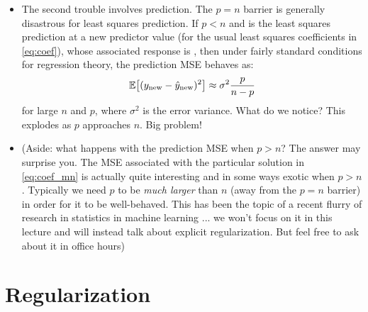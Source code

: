 \documentclass{article}
\begin{document}
\begin{itemize}
\item The second trouble involves prediction. The $p = n$ barrier is generally
  disastrous for least squares prediction. If $p < n$ and  is the least squares prediction at a new predictor
  value  (for \smash{$\hbeta$} the usual least squares
  coefficients in \eqref{eq:coef}), whose associated response is
  , then under fairly standard conditions for regression
  theory,
  the prediction MSE behaves as: 
  \[
  \mathbb{E} \big[ (y_{\text{new}} - \hat{y}_{\text{new}})^2 \big] \approx \sigma^2
  \frac{p}{n-p} 
  \]
  for large $n$ and $p$, where $\sigma^2$ is the error variance. What do we
  notice? This explodes as $p$ approaches $n$. Big problem!

\item (Aside: what happens with the prediction MSE when $p > n$? The answer may
  surprise you. The MSE associated with the particular solution in
  \eqref{eq:coef_mn} is actually quite interesting and in some ways exotic when 
  $p > n$. Typically we need $p$ to be \emph{much larger} than $n$ (away from
  the $p = n$ barrier) in order for it to be well-behaved. This has been the
  topic of a recent flurry of research in statistics in machine learning ...  we
  won't focus on it in this lecture and will instead talk about explicit
  regularization. But feel free to ask about it in office hours)    
\end{itemize}

\section{Regularization}
\end{document}
